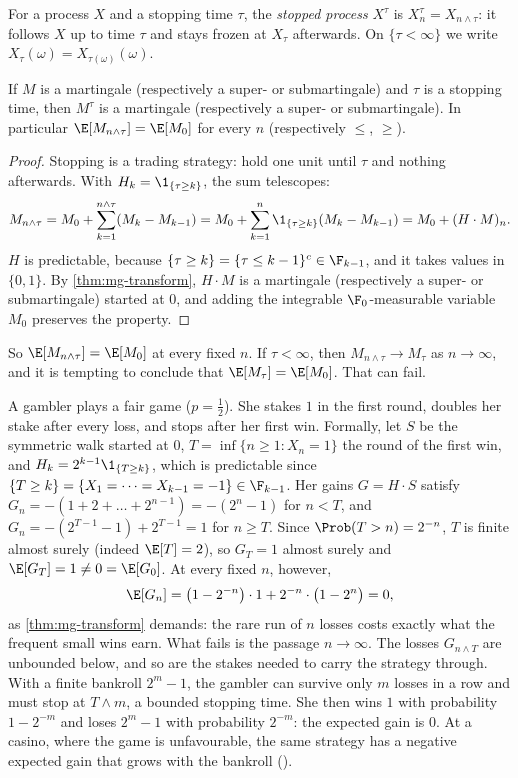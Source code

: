For a process $X$ and a stopping time $\tau$, the \emph{stopped process} $X^\tau$ is
$X^\tau_n=X_{n\wedge\tau}$: it follows $X$ up to time $\tau$ and stays frozen at $X_\tau$
afterwards. On $\{\tau<\infty\}$ we write $X_\tau(\omega)=X_{\tau(\omega)}(\omega)$.

\begin{proposition}\label{prop:mg-stopped}
If $M$ is a martingale (respectively a super- or submartingale) and $\tau$ is a stopping time,
then $M^\tau$ is a martingale (respectively a super- or submartingale). In particular
$\E[M_{n\wedge\tau}]=\E[M_0]$ for every $n$ (respectively $\le$, $\ge$).
\end{proposition}

\begin{proof}
Stopping is a trading strategy: hold one unit until $\tau$ and nothing afterwards. With
$H_k=\1_{\{\tau\ge k\}}$, the sum telescopes:
\[
  M_{n\wedge\tau}=M_0+\sum_{k=1}^{n\wedge\tau}(M_k-M_{k-1})=M_0+\sum_{k=1}^{n}\1_{\{\tau\ge k\}}(M_k-M_{k-1})=M_0+(H\cdot M)_n .
\]
$H$ is predictable, because $\{\tau\ge k\}=\{\tau\le k-1\}^c\in\F_{k-1}$, and it takes values
in $\{0,1\}$. By \cref{thm:mg-transform}, $H\cdot M$ is a martingale (respectively a super-
or submartingale) started at $0$, and adding the integrable $\F_0$-measurable variable $M_0$
preserves the property.
\end{proof}

So $\E[M_{n\wedge\tau}]=\E[M_0]$ at every fixed $n$. If $\tau<\infty$, then
$M_{n\wedge\tau}\to M_\tau$ as $n\to\infty$, and it is tempting to conclude that
$\E[M_\tau]=\E[M_0]$. That can fail.

\begin{example}\label{exa:mg-doubling}
A gambler plays a fair game ($p=\frac12$). She stakes $1$ in the first round, doubles her
stake after every loss, and stops after her first win. Formally, let $S$ be the symmetric walk
started at $0$, $T=\inf\{n\ge1:X_n=1\}$ the round of the first win, and
$H_k=2^{k-1}\1_{\{T\ge k\}}$, which is predictable since
$\{T\ge k\}=\{X_1=\dots=X_{k-1}=-1\}\in\F_{k-1}$. Her gains $G=H\cdot S$ satisfy
$G_n=-(1+2+\dots+2^{n-1})=-(2^n-1)$ for $n<T$, and $G_n=-(2^{T-1}-1)+2^{T-1}=1$ for
$n\ge T$. Since $\Prob(T>n)=2^{-n}$, $T$ is finite almost surely (indeed $\E[T]=2$), so
$G_T=1$ almost surely and $\E[G_T]=1\ne0=\E[G_0]$. At every fixed $n$, however,
\[
  \E[G_n]=\big(1-2^{-n}\big)\cdot1+2^{-n}\cdot\big(1-2^n\big)=0,
\]
as \cref{thm:mg-transform} demands: the rare run of $n$ losses costs exactly what the
frequent small wins earn. What fails is the passage $n\to\infty$. The losses $G_{n\wedge T}$
are unbounded below, and so are the stakes needed to carry the strategy through.
With a finite bankroll $2^m-1$, the gambler can survive only $m$ losses in a row and must stop
at $T\wedge m$, a bounded stopping time. She then wins $1$ with probability $1-2^{-m}$ and
loses $2^m-1$ with probability $2^{-m}$: the expected gain is $0$. At a casino, where the game
is unfavourable, the same strategy has a negative expected gain that grows with the bankroll
().
\end{example}

